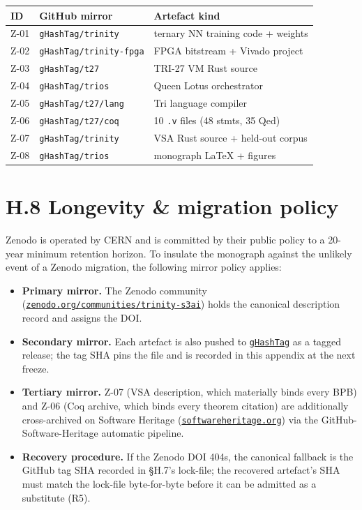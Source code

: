 \begin{small}
\begin{tabular}{lll}
\toprule
\textbf{ID} & \textbf{GitHub mirror} & \textbf{Artefact kind} \\
\midrule
Z-01 & \texttt{gHashTag/trinity}      & ternary NN training code + weights \\
Z-02 & \texttt{gHashTag/trinity-fpga} & FPGA bitstream + Vivado project \\
Z-03 & \texttt{gHashTag/t27}          & TRI-27 VM Rust source \\
Z-04 & \texttt{gHashTag/trios}        & Queen Lotus orchestrator \\
Z-05 & \texttt{gHashTag/t27/lang}     & Tri language compiler \\
Z-06 & \texttt{gHashTag/t27/coq}      & 10 \texttt{.v} files (48 stmts, 35 Qed) \\
Z-07 & \texttt{gHashTag/trinity}      & VSA Rust source + held-out corpus \\
Z-08 & \texttt{gHashTag/trios}        & monograph LaTeX + figures \\
\bottomrule
\end{tabular}
\end{small}

\section*{H.8 Longevity \& migration policy}

\noindent Zenodo is operated by CERN and is committed by their public policy
to a 20-year minimum retention horizon. To insulate the monograph against
the unlikely event of a Zenodo migration, the following mirror policy
applies:

\begin{itemize}\setlength\itemsep{0.1em}
  \item \textbf{Primary mirror.} The Zenodo community
    (\href{https://zenodo.org/communities/trinity-s3ai/}{\texttt{zenodo.org/communities/trinity-s3ai}})
    holds the canonical description record and assigns the DOI.
  \item \textbf{Secondary mirror.} Each artefact is also pushed to
    \href{https://github.com/gHashTag}{\texttt{gHashTag}} as a tagged
    release; the tag SHA pins the file and is recorded in this appendix
    at the next freeze.
  \item \textbf{Tertiary mirror.} Z-07 (VSA description, which materially
    binds every BPB) and Z-06 (Coq archive, which binds every theorem
    citation) are additionally cross-archived on Software Heritage
    (\href{https://www.softwareheritage.org/}{\texttt{softwareheritage.org}})
    via the GitHub-Software-Heritage automatic pipeline.
  \item \textbf{Recovery procedure.} If the Zenodo DOI 404s, the canonical
    fallback is the GitHub tag SHA recorded in \S H.7's lock-file; the
    recovered artefact's SHA must match the lock-file byte-for-byte before
    it can be admitted as a substitute (R5).
\end{itemize}

